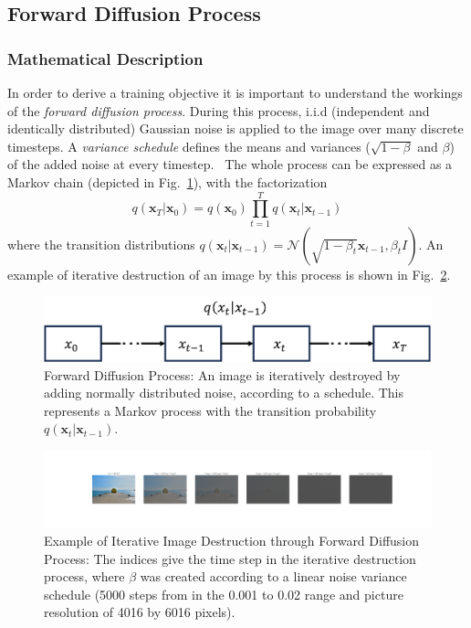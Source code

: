 \subsection{Forward Diffusion Process}
\subsubsection{Mathematical Description}
In order to derive a training objective it is important to understand the workings of the \textit{forward diffusion process}. During this process, i.i.d (independent and identically distributed) Gaussian noise is applied to the image over many discrete timesteps. A \textit{variance schedule} defines the means and variances ($\sqrt{1-\beta}$ and $\beta$) of the added noise at every timestep.~\autocite{ho2020denoising} The whole process can be expressed as a Markov chain (depicted in Fig.~\ref{fig:forward_diffusion}), with the factorization
\begin{equation}
    \label{eq:forwardprocess}
    q(\bm{x}_T|\bm{x}_0) = q(\bm{x}_0) \prod_{t=1}^{T} q(\bm{x}_{t}|\bm{x}_{t-1})
\end{equation}
where the transition distributions $q(\bm{x}_t|\bm{x}_{t-1}) = \mathcal{N}(\sqrt{1-\beta_t} \bm{x}_{t-1}, \beta_t I)$. An example of iterative destruction of an image by this process is shown in Fig.~\ref{fig:forward_naoshima}.

\begin{figure}[h]
    \centering
    \includegraphics[width=.5\textwidth]{images/forward_diffusion.png}
    \caption{Forward Diffusion Process: An image is iteratively destroyed by adding normally distributed noise,
        according to a schedule. This represents a Markov process with the transition probability $q(\bm{x}_t|\bm{x}_{t-1})$.}
    \label{fig:forward_diffusion}
\end{figure}

\begin{figure}[h]
    \centering
    \includegraphics[width=\textwidth]{images/forward_naoshima.png}
    \caption{Example of Iterative Image Destruction through Forward Diffusion Process:
        The indices give the time step in the iterative destruction process, where $\beta$ was created according to a linear noise variance schedule (5000 steps from in the 0.001 to 0.02 range and picture resolution of 4016 by 6016 pixels).}
    \label{fig:forward_naoshima}
\end{figure}

